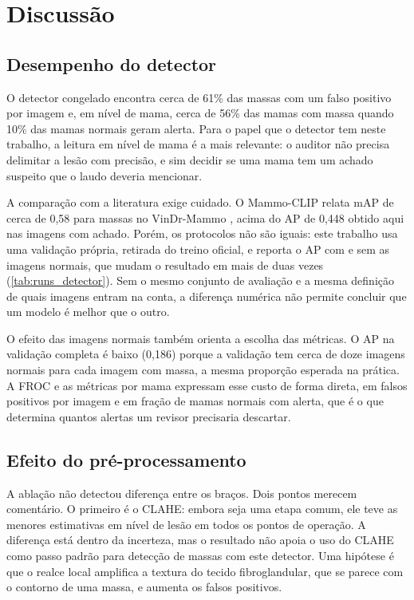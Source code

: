 \chapter{Discussão}\label{cap:discussao}

\section{Desempenho do detector}

O detector congelado encontra cerca de 61\% das massas com um falso positivo por imagem e, em nível de mama, cerca de 56\% das mamas com massa quando 10\% das mamas normais geram alerta. Para o papel que o detector tem neste trabalho, a leitura em nível de mama é a mais relevante: o auditor não precisa delimitar a lesão com precisão, e sim decidir se uma mama tem um achado suspeito que o laudo deveria mencionar.

A comparação com a literatura exige cuidado. O Mammo-CLIP relata mAP de cerca de 0,58 para massas no VinDr-Mammo \cite{ghosh2024mammoclip}, acima do AP de 0,448 obtido aqui nas imagens com achado. Porém, os protocolos não são iguais: este trabalho usa uma validação própria, retirada do treino oficial, e reporta o AP com e sem as imagens normais, que mudam o resultado em mais de duas vezes (\autoref{tab:runs_detector}). Sem o mesmo conjunto de avaliação e a mesma definição de quais imagens entram na conta, a diferença numérica não permite concluir que um modelo é melhor que o outro. 

O efeito das imagens normais também orienta a escolha das métricas. O AP na validação completa é baixo (0,186) porque a validação tem cerca de doze imagens normais para cada imagem com massa, a mesma proporção esperada na prática. A FROC e as métricas por mama expressam esse custo de forma direta, em falsos positivos por imagem e em fração de mamas normais com alerta, que é o que determina quantos alertas um revisor precisaria descartar.

\section{Efeito do pré-processamento}

A ablação não detectou diferença entre os braços. Dois pontos merecem comentário. O primeiro é o CLAHE: embora seja uma etapa comum, ele teve as menores estimativas em nível de lesão em todos os pontos de operação. A diferença está dentro da incerteza, mas o resultado não apoia o uso do CLAHE como passo padrão para detecção de massas com este detector. Uma hipótese é que o realce local amplifica a textura do tecido fibroglandular, que se parece com o contorno de uma massa, e aumenta os falsos positivos.

